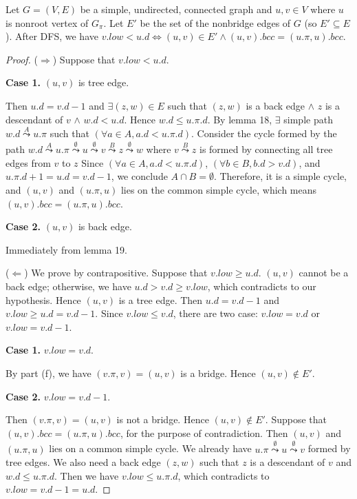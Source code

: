 \begin{claim}
    Let $G = (V,E)$ be a simple, undirected, connected graph
    and $u,v \in V$ where $u$ is nonroot vertex of $G_\pi$.
    Let $E'$ be the set of the nonbridge edges of $G$ (so $E' \subseteq E$).
    After DFS, we have
    $v.low < u.d \Longleftrightarrow 
    (u,v) \in E' \wedge (u,v).bcc = (u.\pi,u).bcc$.
\end{claim}

\begin{proof}
    ($\Longrightarrow$)
    Suppose that $v.low < u.d$.
    
    \textbf{Case 1.}
    $(u,v)$ is tree edge.

    Then $u.d = v.d - 1$ and $\exists (z,w) \in E$ such that
    $(z,w)$ is a back edge $\wedge$ $z$ is a descendant of $v$
    $\wedge$ $w.d < u.d$.
    Hence $w.d \leq u.\pi.d$.
    By lemma 18, $\exists$ simple path
    $w.d \overset{A}{\leadsto} u.\pi$
    such that $(\forall a \in A, a.d < u.\pi.d)$.
    Consider the cycle formed by the path
    $w.d \overset{A}{\leadsto} u.\pi 
    \overset{\emptyset}{\leadsto} u 
    \overset{\emptyset}{\leadsto} v
    \overset{B}{\leadsto} z
    \overset{\emptyset}{\leadsto} w$
    where $v \overset{B}{\leadsto} z$
    is formed by connecting all tree edges from $v$ to $z$
    Since $(\forall a \in A, a.d < u.\pi.d)$,
    $(\forall b \in B, b.d > v.d)$, and $u.\pi.d + 1 = u.d = v.d - 1$,
    we conclude $A \cap B = \emptyset$.
    Therefore, it is a simple cycle, and 
    $(u,v)$ and $(u.\pi,u)$ lies on the common simple cycle,
    which means $(u,v).bcc = (u.\pi,u).bcc$.

    \textbf{Case 2.}
    $(u,v)$ is back edge.
    
    Immediately from lemma 19.

    ($\Longleftarrow$)
    We prove by contrapositive.
    Suppose that $v.low \geq u.d$.
    $(u,v)$ cannot be a back edge;
    otherwise, we have $u.d > v.d \geq v.low$,
    which contradicts to our hypothesis.
    Hence $(u,v)$ is a tree edge.
    Then $u.d = v.d - 1$ and $v.low \geq u.d = v.d - 1$.
    Since $v.low \leq v.d$, 
    there are two case: $v.low = v.d$ or $v.low = v.d - 1$.

    \textbf{Case 1.}
    $v.low = v.d$.

    By part (f), we have $(v.\pi,v) = (u,v)$ is a bridge.
    Hence $(u,v) \notin E'$.

    \textbf{Case 2.}
    $v.low = v.d - 1$.

    Then $(v.\pi,v) = (u,v)$ is not a bridge.
    Hence $(u,v) \notin E'$.
    Suppose that $(u,v).bcc = (u.\pi,u).bcc$,
    for the purpose of contradiction.
    Then $(u,v)$ and $(u.\pi,u)$ lies on a common simple cycle.
    We already have $u.\pi \overset{\emptyset}{\leadsto} u 
    \overset{\emptyset}{\leadsto} v$
    formed by tree edges.
    We also need a back edge $(z,w)$ such that
    $z$ is a descendant of $v$ and $w.d \leq u.\pi.d$.
    Then we have $v.low \leq u.\pi.d$,
    which contradicts to $v.low = v.d - 1 = u.d$.
\end{proof}


